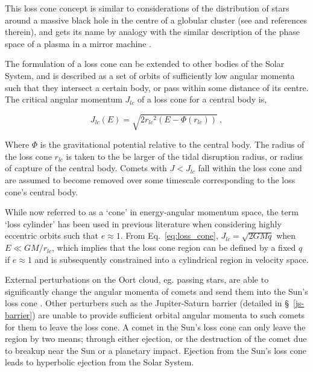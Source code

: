 This loss cone concept is similar to considerations of the distribution of stars around a massive black hole in the centre of a globular cluster (see \cite{1978ApJ...226.1087C} and references therein), and gets its name by analogy with the similar description of the phase space of a plasma in a mirror machine \citep{baldwin1972plasma}. 

The formulation of a loss cone can be extended to other bodies of the Solar System, and is described as a set of orbits of sufficiently low angular momenta such that they intersect a certain body, or pass within some distance of its centre. The critical angular momentum $J_{lc}$ of a loss cone for a central body is,

\begin{equation}
    J_{lc}(E) = \sqrt{ 2 {r_{lc}}^2 \left(E - \Phi(r_{lc})\right) }~,
    \label{eq:loss_cone}
\end{equation}

Where $\Phi$ is the gravitational potential relative to the central body. The radius of the loss cone $r_{lc}$ is taken to the be larger of the tidal disruption radius, or radius of capture of the central body. Comets with $J < J_{lc}$ fall within the loss cone and are assumed to become removed over some timescale corresponding to the loss cone's central body. 

While now referred to as a `cone' in energy-angular momentum space, the term `loss cylinder' has been used in previous literature when considering highly eccentric orbits such that $e \approx 1$. From Eq.~\eqref{eq:loss_cone}, $J_{lc} = \sqrt{2GMq}$ when $E \ll GM/r_{lc}$, which implies that the loss cone region can be defined by a fixed $q$ if $e \approx 1$ and is subsequently constrained into a cylindrical region in velocity space. %

External perturbations on the Oort cloud, eg. passing stars, are able to significantly change the angular momenta of comets and send them into the Sun's loss cone \citep{1950BAN....11...91O}. Other perturbers such as the Jupiter-Saturn barrier (detailed in \S~\ref{js-barrier}) are unable to provide sufficient orbital angular momenta to such comets for them to leave the loss cone. A comet in the Sun's loss cone can only leave the region by two means; through either ejection, or the destruction of the comet due to breakup near the Sun or a planetary impact. Ejection from the Sun's loss cone leads to hyperbolic ejection from the Solar System. 

